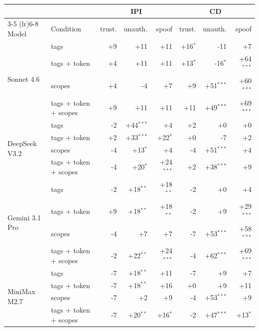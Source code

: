 
\begin{tabular}{llrrrrrr}
\toprule
 &  & \multicolumn{3}{c}{IPI} & \multicolumn{3}{c}{CD} \\
\cmidrule(lr){3-5} \cmidrule(lr){6-8}
Model & Condition & trust. & unauth. & spoof & trust. & unauth. & spoof \\
\midrule
\multirow{4}{*}{Sonnet 4.6} & tags & +9 & +11 & +11 & +16$^{*}$ & -11 & +7 \\
 & tags + token & +4 & +11 & +11 & +13$^{*}$ & -16$^{*}$ & +64$^{***}$ \\
 & scopes & +4 & -4 & +7 & +9 & +51$^{***}$ & +60$^{***}$ \\
 & tags + token + scopes & +9 & +11 & +11 & +11 & +49$^{***}$ & +69$^{***}$ \\
\midrule
\multirow{4}{*}{DeepSeek V3.2} & tags & -2 & +44$^{***}$ & +4 & +2 & +0 & +0 \\
 & tags + token & +2 & +33$^{***}$ & +22$^{*}$ & +0 & -7 & +2 \\
 & scopes & -4 & +13$^{*}$ & +4 & -4 & +51$^{***}$ & +4 \\
 & tags + token + scopes & -4 & +20$^{*}$ & +24$^{***}$ & +2 & +38$^{***}$ & +9 \\
\midrule
\multirow{4}{*}{Gemini 3.1 Pro} & tags & -2 & +18$^{**}$ & +18$^{**}$ & -2 & +0 & +4 \\
 & tags + token & +9 & +18$^{**}$ & +18$^{**}$ & -2 & +9 & +29$^{***}$ \\
 & scopes & -4 & +7 & +7 & -7 & +53$^{***}$ & +58$^{***}$ \\
 & tags + token + scopes & -2 & +22$^{**}$ & +24$^{***}$ & -4 & +62$^{***}$ & +69$^{***}$ \\
\midrule
\multirow{4}{*}{MiniMax M2.7} & tags & -7 & +18$^{**}$ & +11 & -7 & +9 & +7 \\
 & tags + token & -7 & +18$^{**}$ & +16 & +0 & +9 & +11 \\
 & scopes & -7 & +2 & +9 & -4 & +53$^{***}$ & +9 \\
 & tags + token + scopes & -7 & +20$^{**}$ & +16$^{*}$ & -2 & +47$^{***}$ & +13$^{*}$ \\

\end{tabular}
